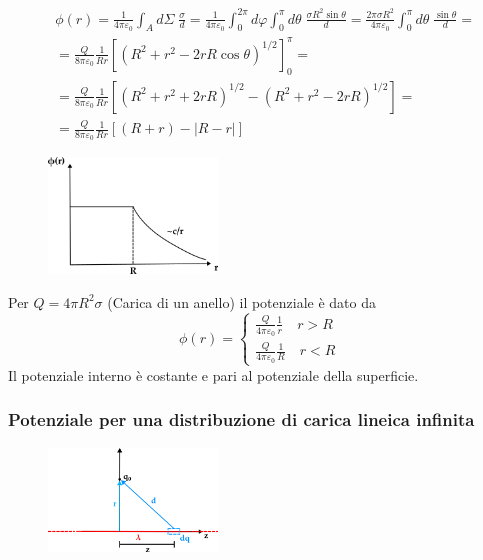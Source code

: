 \begin{equation*}
\begin{aligned}
	 & \phi(r) = \frac{1}{4 \pi \varepsilon_0} \int_{A} d\Sigma \; \frac{\sigma }{d} = \frac{1}{4 \pi \varepsilon_0} \int_{0}^{2\pi}d \varphi \int_{0}^{\pi}d\theta \; \frac{\sigma R^2 \sin\theta }{d} =  \frac{2\pi \sigma R^2}{4\pi \varepsilon_0} \int_{0}^{\pi}d\theta \; \frac{\sin \theta}{d} =  \\[0.5cm]
	& = \frac{Q}{8 \pi \varepsilon_0} \frac{1}{Rr} \left [(R^2+r^2 - 2rR \cos \theta)^{1/2} \right ]_{0}^{\pi} = \\[0.5cm]
	&  = \frac{Q}{8 \pi \varepsilon_0} \frac{1}{Rr} \left [(R^2+r^2+2rR)^{1/2} - (R^2+r^2-2rR)^{1/2} \right ] = \\[0.5cm]
	& = \frac{Q}{8 \pi \varepsilon_0} \frac{1}{Rr} \left [(R+r)-|R-r| \right ] 
\end{aligned}
\end{equation*}
\begin{figure}
\vspace{-1.7cm}
  \begin{center}
    \includegraphics[width=0.4\textwidth]{images/chargesurf}
  \end{center}
\end{figure}
Per $Q = 4\pi R^2 \sigma $ (Carica di un anello) il potenziale \`e dato da
\begin{equation*}
	\phi(r) = 
	\left \{ \begin{array}{l}
		 \frac{Q}{4 \pi \varepsilon_0} \frac{1}{r} \quad r >R \\
		 \frac{Q}{4 \pi \varepsilon_0} \frac{1}{R} \quad r < R
		 \end{array}\right.
\end{equation*}
Il potenziale interno \`e costante e pari al potenziale della superficie.

\subsubsection{Potenziale per una distribuzione di carica lineica infinita}

\begin{figure}
  \begin{center}
    \includegraphics[width=0.4\textwidth]{images/lineinf}
  \end{center}
\end{figure}

